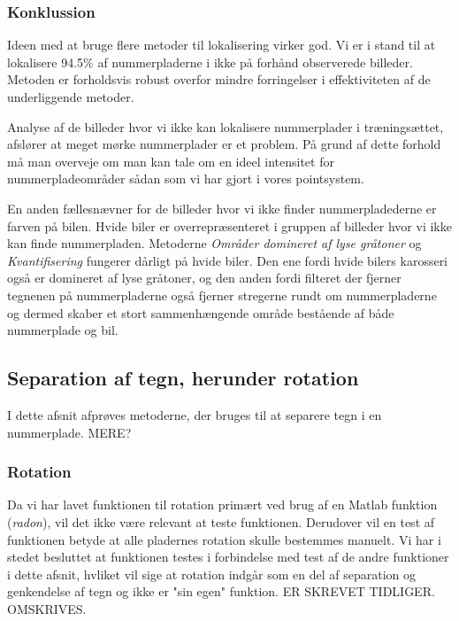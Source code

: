 \subsubsection{Konklussion}
Ideen med at bruge flere metoder til lokalisering virker god. Vi er i stand til at lokalisere 94.5\% af nummerpladerne i ikke på forhånd observerede billeder. Metoden er forholdsvis robust overfor mindre forringelser i effektiviteten af de underliggende metoder.

Analyse af de billeder hvor vi ikke kan lokalisere nummerplader i træningsættet, afslører at meget mørke nummerplader er et problem. På grund af dette forhold må man overveje om man kan tale om en ideel intensitet for nummerpladeområder sådan som vi har gjort i vores pointsystem.

En anden fællesnævner for de billeder hvor vi ikke finder nummerpladederne er farven på bilen. Hvide biler er overrepræsenteret i gruppen af billeder hvor vi ikke kan finde nummerpladen. Metoderne \textit{Områder domineret af lyse gråtoner} og \textit{Kvantifisering} fungerer dårligt på hvide biler. Den ene fordi hvide bilers karosseri også er domineret af lyse gråtoner, og den anden fordi filteret der fjerner tegnenen på nummerpladerne også fjerner stregerne rundt om nummerpladerne og dermed skaber et stort sammenhængende område bestående af både nummerplade og bil. 

 



\subsection{Separation af tegn, herunder rotation}


I dette afsnit afprøves metoderne, der bruges til at separere tegn i en nummerplade. MERE?

\subsubsection*{Rotation}

Da vi har lavet funktionen til rotation primært ved brug af en Matlab funktion (\textit{radon}), vil det ikke være relevant at teste funktionen. Derudover vil en test af funktionen betyde at alle pladernes rotation skulle bestemmes manuelt. Vi har i stedet besluttet at funktionen testes i forbindelse med test af de andre funktioner i dette afsnit, hvliket vil sige at rotation indgår som en del af separation og genkendelse af tegn og ikke er "sin egen" funktion. ER SKREVET TIDLIGER. OMSKRIVES.

